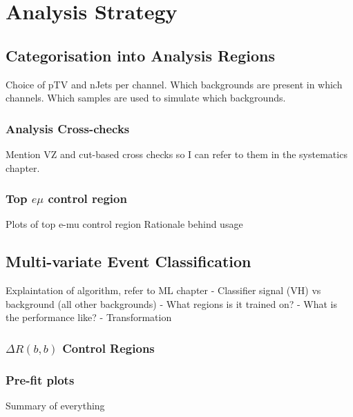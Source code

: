 \chapter{Analysis Strategy}%
\label{ch:strategy}
\section{Categorisation into Analysis Regions}
\label{sec:ana-regions}
Choice of pTV and nJets per channel.
Which backgrounds are present in which channels.
Which samples are used to simulate which backgrounds.
\subsection{Analysis Cross-checks}
Mention VZ and cut-based cross checks so I can refer to them in the systematics
chapter.


\subsection{Top \texorpdfstring{$e \mu$}{e mu} control region}%
\label{sec:topemucr}
Plots of top e-mu control region
Rationale behind usage
\section{Multi-variate Event Classification}%
\label{sec:mva}
Explaintation of algorithm, refer to ML chapter
- Classifier signal (VH) vs background (all other backgrounds)
- What regions is it trained on?
- What is the performance like?
- Transformation



\subsection{\texorpdfstring{$\Delta R(b,b)$}{DRbb} Control Regions}%
\label{sec:control-region-defintions}

\subsection{Pre-fit plots}
Summary of everything











